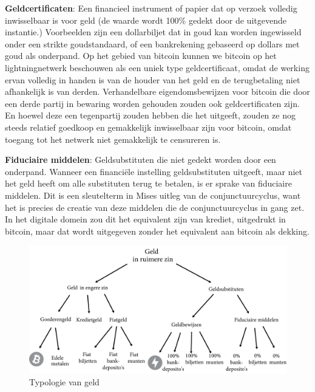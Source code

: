\vspace{1em}\noindent\textbf{Geldcertificaten}: Een financieel instrument of papier dat op verzoek volledig inwisselbaar is voor geld (de waarde wordt 100\% gedekt door de uitgevende instantie.) Voorbeelden zijn een dollarbiljet dat in goud kan worden ingewisseld onder een strikte goudstandaard, of een bankrekening gebaseerd op dollars met goud als onderpand. Op het gebied van bitcoin kunnen we bitcoin op het lightningnetwerk beschouwen als een uniek type geldcertificaat, omdat de werking ervan volledig in handen is van de houder van het geld en de terugbetaling niet afhankelijk is van derden. Verhandelbare eigendomsbewijzen voor bitcoin die door een derde partij in bewaring worden gehouden zouden ook geldcertificaten zijn. En hoewel deze een tegenpartij zouden hebben die het uitgeeft, zouden ze nog steeds relatief goedkoop en gemakkelijk inwisselbaar zijn voor bitcoin, omdat toegang tot het netwerk niet gemakkelijk te censureren is.

\vspace{1em}\noindent\textbf{Fiduciaire middelen}: Geldsubstituten die niet gedekt worden door een onderpand. Wanneer een financiële instelling geldsubstituten uitgeeft, maar niet het geld heeft om alle substituten terug te betalen, is er sprake van fiduciaire middelen. Dit is een sleutelterm in Mises\textquotesingle{} uitleg van de conjunctuurcyclus, want het is precies de creatie van deze middelen die de conjunctuurcyclus in gang zet. In het digitale domein zou dit het equivalent zijn van krediet, uitgedrukt in bitcoin, maar dat wordt uitgegeven zonder het equivalent aan bitcoin als dekking.

\begin{figure}[H]
\centering
    \includegraphics[width=\textwidth]{figures/fig31.pdf}
    \caption[Typologie van geld]{Typologie van geld\footnotemark}
    \label{fig31}
\end{figure}
\autocite{172}

